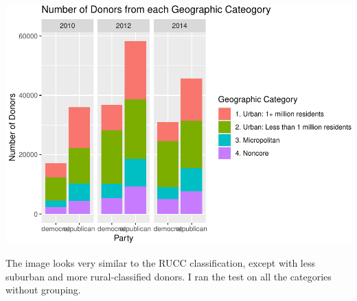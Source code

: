 \documentclass[10pt,]{article}
\begin{document}
\includegraphics{scratch_files/figure-latex/unnamed-chunk-25-1.pdf}

The image looks very similar to the RUCC classification, except with
less suburban and more rural-classified donors. I ran the test on all
the categories without grouping.
\end{document}
